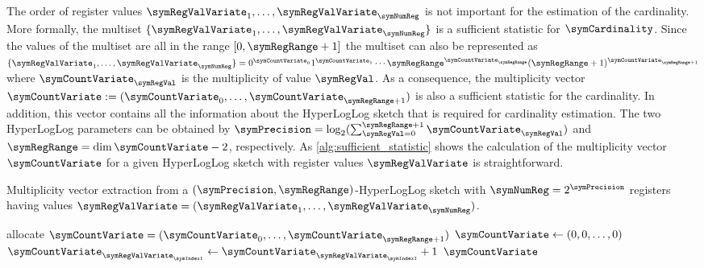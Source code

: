 \documentclass[a4paper]{scrartcl}
\newcommand{\comm}[2]{{\Comment{\parbox[t]{#1\linewidth}{{#2}}}}}
\begin{document}
The order of register values $\symRegValVariate_1,\ldots,\symRegValVariate_\symNumReg$ is not important for the estimation of the cardinality. More formally, the multiset $\lbrace\symRegValVariate_1,\ldots,\symRegValVariate_\symNumReg\rbrace$ is a sufficient statistic for $\symCardinality$.
Since the values of the multiset are all in the range $[0, \symRegRange+1]$ the multiset can also be represented as $\lbrace\symRegValVariate_1,\ldots,\symRegValVariate_\symNumReg\rbrace = 0^{\symCountVariate_0}1^{\symCountVariate_1}\cdots\symRegRange^{\symCountVariate_{\symRegRange}}(\symRegRange+1)^{\symCountVariate_{\symRegRange+1}}$ where $\symCountVariate_\symRegVal$ is the multiplicity of value $\symRegVal$. As a consequence, the multiplicity vector $\boldsymbol{\symCountVariate} := (\symCountVariate_0,\ldots,\symCountVariate_{\symRegRange+1})$ is also a sufficient statistic for the cardinality. In addition, this vector contains all the information about the HyperLogLog sketch that is required for cardinality estimation. The two HyperLogLog parameters can be obtained by $\symPrecision = \log_2 (\sum_{\symRegVal=0}^{\symRegRange+1}\symCountVariate_\symRegVal
)$ and $\symRegRange=\dim\boldsymbol{\symCountVariate}-2$, respectively. As \cref{alg:sufficient_statistic} shows the calculation of the multiplicity vector $\boldsymbol{\symCountVariate}$ for a given HyperLogLog sketch with register values $\boldsymbol{\symRegValVariate}$ is straightforward.

\begin{algorithm}
\caption{Multiplicity vector extraction from a $(\symPrecision, \symRegRange)$-HyperLogLog sketch with $\symNumReg=2^\symPrecision$ registers having values $\boldsymbol{\symRegValVariate} = (\symRegValVariate_1,\ldots,\symRegValVariate_\symNumReg)$.} 
\label{alg:sufficient_statistic}
\begin{algorithmic}
\comm{.4}{$\boldsymbol{\symRegValVariate}\in\lbrace 0,1,\ldots,\symRegRange+1\rbrace^\symNumReg$}
\State allocate $\boldsymbol{\symCountVariate} = (\symCountVariate_0,\ldots,\symCountVariate_{\symRegRange+1})$
\State $\boldsymbol{\symCountVariate}\gets \left(0,0,\ldots, 0\right)$
\State $\symCountVariate_{\symRegValVariate_\symIndexI} \gets \symCountVariate_{\symRegValVariate_\symIndexI} + 1$
\EndFor
\State \Return $\boldsymbol{\symCountVariate}$
\EndFunction
\end{algorithmic}
\end{algorithm}
\end{document}
